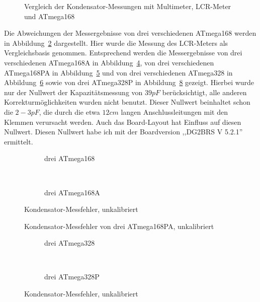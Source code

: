 \begin{figure}[H]
\centering

\caption{Vergleich der Kondensator-Messungen mit Multimeter, LCR-Meter und ATmega168}
\label{fig:capcompare}
\end{figure}

Die Abweichungen der Messergebnisse von drei verschiedenen ATmega168 werden in Abbildung~\ref{fig:mega168all} dargestellt.
Hier wurde die Messung des LCR-Meters als Vergleichsbasis genommen.
Entsprechend werden die Messergebnisse von drei verschiedenen ATmega168A in Abbildung~\ref{fig:mega168Aall}, 
von drei verschiedenen ATmega168PA in Abbildung~\ref{fig:mega168PAall} und von drei verschiedenen
ATmega328 in Abbildung~\ref{fig:mega328all} sowie von drei ATmega328P in Abbildung~\ref{fig:mega328Pall} gezeigt.
Hierbei wurde nur der Nullwert der Kapazitätsmessung von \(39pF\) berücksichtigt, alle anderen Korrekturmöglichkeiten wurden
nicht benutzt. Dieser Nullwert beinhaltet schon die \(2-3pF\), die durch die etwa \(12cm\) langen Anschlussleitungen mit den
Klemmen verursacht werden.
Auch das Board-Layout hat Einfluss auf diesen Nullwert. Diesen Nullwert habe ich mit der Boardversion ,,DG2BRS V 5.2.1'' ermittelt.

\begin{figure}[H]
  \begin{subfigure}[b]{9cm}
    \centering
    \resizebox{9cm}{!}{}
    \caption{drei ATmega168}
    \label{fig:mega168all}
  \end{subfigure}
  ~
  \begin{subfigure}[b]{9cm}
    \centering
    \resizebox{9cm}{!}{}
    \caption{drei ATmega168A}
    \label{fig:mega168Aall}
  \end{subfigure}
  \caption{Kondensator-Messfehler, unkalibriert}
\end{figure}

\begin{figure}[H]
\centering

\caption{Kondensator-Messfehler von drei ATmega168PA, unkalibriert}
\label{fig:mega168PAall}
\end{figure}

\begin{figure}[H]
  \begin{subfigure}[b]{9cm}
    \centering
    \resizebox{9cm}{!}{}
    \caption{drei ATmega328}
    \label{fig:mega328all}
  \end{subfigure}
  ~
  \begin{subfigure}[b]{9cm}
    \centering
    \resizebox{9cm}{!}{}
    \caption{drei ATmega328P}
    \label{fig:mega328Pall}
  \end{subfigure}
  \caption{Kondensator-Messfehler, unkalibriert}
\end{figure}

